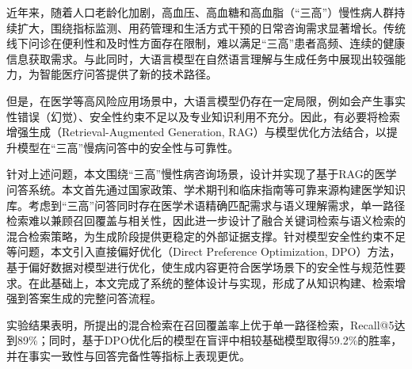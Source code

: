 
\begin{chineseabstract}

近年来，随着人口老龄化加剧，高血压、高血糖和高血脂（“三高”）慢性病人群持续扩大，围绕指标监测、用药管理和生活方式干预的日常咨询需求显著增长。传统线下问诊在便利性和及时性方面存在限制，难以满足“三高”患者高频、连续的健康信息获取需求。与此同时，大语言模型在自然语言理解与生成任务中展现出较强能力，为智能医疗问答提供了新的技术路径。

但是，在医学等高风险应用场景中，大语言模型仍存在一定局限，例如会产生事实性错误（幻觉）、安全性约束不足以及专业知识利用不充分。因此，有必要将检索增强生成（Retrieval-Augmented Generation, RAG）与模型优化方法结合，以提升模型在“三高”慢病问答中的安全性与可靠性。

针对上述问题，本文围绕“三高”慢性病咨询场景，设计并实现了基于RAG的医学问答系统。本文首先通过国家政策、学术期刊和临床指南等可靠来源构建医学知识库。考虑到“三高”问答同时存在医学术语精确匹配需求与语义理解需求，单一路径检索难以兼顾召回覆盖与相关性，因此进一步设计了融合关键词检索与语义检索的混合检索策略，为生成阶段提供更稳定的外部证据支撑。针对模型安全性约束不足等问题，本文引入直接偏好优化（Direct Preference Optimization, DPO）方法，基于偏好数据对模型进行优化，使生成内容更符合医学场景下的安全性与规范性要求。在此基础上，本文完成了系统的整体设计与实现，形成了从知识构建、检索增强到答案生成的完整问答流程。

实验结果表明，所提出的混合检索在召回覆盖率上优于单一路径检索，Recall@5达到89\%；同时，基于DPO优化后的模型在盲评中相较基础模型取得59.2\%的胜率，并在事实一致性与回答完备性等指标上表现更优。

\end{chineseabstract}

